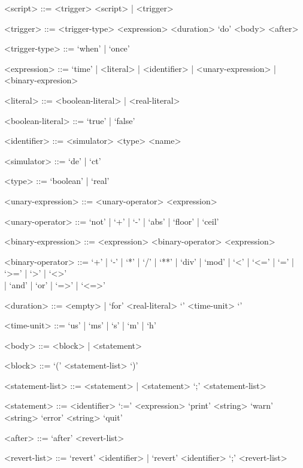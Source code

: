 \documentclass{crescendorepchap}
\begin{document}
\begin{grammar}
<script> ::= <trigger> <script> | <trigger>

<trigger> ::= <trigger-type> <expression> <duration> `do' <body> <after>

<trigger-type> ::= `when' | `once'

<expression> ::= `time' | <literal> | <identifier> | <unary-expression> | <binary-expresion>

<literal> ::= <boolean-literal> | <real-literal>

<boolean-literal> ::= `true' | `false'

<identifier> ::= <simulator> <type> <name>

<simulator> ::= `de' | `ct'

<type> ::= `boolean' | `real'

<unary-expression> ::= <unary-operator> <expression>

<unary-operator> ::= `not' | `+' | `-' | `abs' | `floor' | `ceil'

<binary-expression> ::= <expression> <binary-operator> <expression>

<binary-operator> ::= `+' | `-' | `*' | `/' | `**' | `div' | `mod' | `<' | `<=' | `=' | `>=' | `>' | `<>' \\| `and' | `or' | `=>' | `<=>'

<duration> ::= <empty> | `for' <real-literal> `{' <time-unit> `}'

<time-unit> ::= `us' | `ms' | `s' | `m' | `h'

<body> ::= <block> | <statement>

<block> ::= `(' <statement-list> `)'

<statement-list> ::= <statement> | <statement> `;' <statement-list>

<statement> ::= <identifier> `:=' <expression>
 \alt `print' <string>
 \alt `warn' <string>
 \alt `error' <string>
 \alt `quit'

<after> ::= `after' <revert-list>

<revert-list> ::= `revert' <identifier> | `revert' <identifier> `;' <revert-list>
\end{grammar}

%
%
\end{document}
